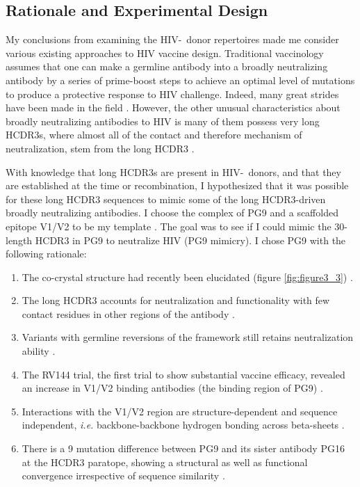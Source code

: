 \subsection{Rationale and Experimental Design}
My conclusions from examining the HIV-\naive~donor repertoires made me consider various existing approaches to HIV vaccine design. Traditional vaccinology assumes that one can make a germline antibody into a broadly neutralizing antibody by a series of prime-boost steps to achieve an optimal level of mutations to produce a protective response to HIV challenge. Indeed, many great strides have been made in the field \citep{Liao:2013gs,JavierGuenaga:2011bf,Kwong:2009hp,DoriaRose:2012if}. However, the other unusual characteristics about broadly neutralizing antibodies to HIV is many of them possess very long HCDR3s, where almost all of the contact and therefore mechanism of neutralization, stem from the long HCDR3 \citep{McLellan:2011dg,Pejchal:2010fp,Klein:2013iz,Zhou:2007bz}.

With knowledge that long HCDR3s are present in HIV-\naive~donors, and that they are established at the time or recombination, I hypothesized that it was possible for these long HCDR3 sequences to mimic some of the long HCDR3-driven broadly neutralizing antibodies. I choose the complex of PG9 and a scaffolded epitope V1/V2 to be my template \citep{McLellan:2011dg}. The goal was to see if I could mimic the 30-length HCDR3 in PG9 to neutralize HIV (PG9 mimicry). I chose PG9 with the following rationale:

\begin{enumerate}
    \item  The co-crystal structure had recently been elucidated (figure \ref{fig:figure3_3}) \citep{McLellan:2011dg}.
	\item  The long HCDR3 accounts for neutralization and functionality with few contact residues in other regions of the antibody \citep{Pancera:2010hh,Pejchal:2010fp}.
	\item  Variants with germline reversions of the framework still retains neutralization ability \citep{Klein:2013iz}.
	\item  The RV144 trial, the first trial to show substantial vaccine efficacy, revealed an increase in V1/V2 binding antibodies (the binding region of PG9) \citep{Haynes:2012ka}.
	\item  Interactions with the V1/V2 region are structure-dependent and sequence independent, \textit{i.e.} backbone-backbone hydrogen bonding across beta-sheets \citep{McLellan:2011dg}.
	\item  There is a 9 mutation difference between PG9 and its sister antibody PG16 at the HCDR3 paratope, showing a structural as well as functional convergence irrespective of sequence similarity \citep{Walker:2009cd,Pancera:2010hh,Pejchal:2010fp}.
\end{enumerate}

